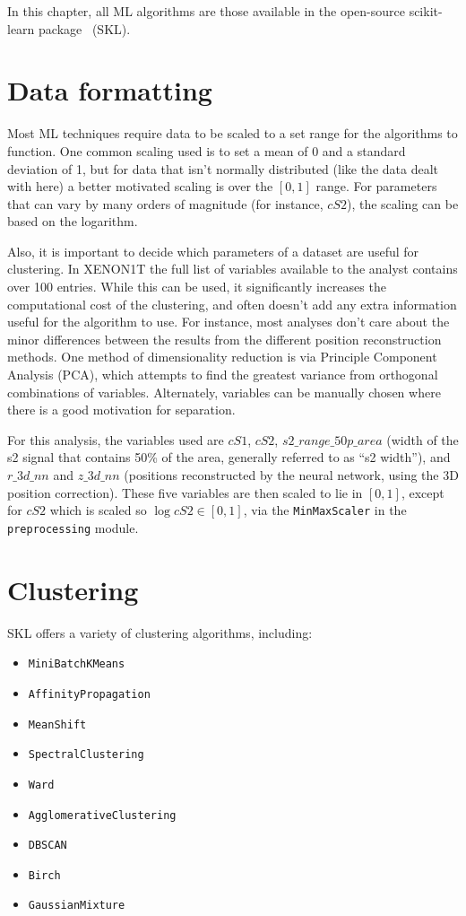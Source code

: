 In this chapter, all ML algorithms are those available in the open-source scikit-learn package~\cite{skl} (SKL).

\section{Data formatting}

Most ML techniques require data to be scaled to a set range for the algorithms to function. One common scaling used is to set a mean of 0 and a standard deviation of 1, but for data that isn't normally distributed (like the data dealt with here) a better motivated scaling is over the $[0,1]$ range. For parameters that can vary by many orders of magnitude (for instance, $cS2$), the scaling can be based on the logarithm.

Also, it is important to decide which parameters of a dataset are useful for clustering. In XENON1T the full list of variables available to the analyst contains over 100 entries. While this can be used, it significantly increases the computational cost of the clustering, and often doesn't add any extra information useful for the algorithm to use. For instance, most analyses don't care about the minor differences between the results from the different position reconstruction methods. One method of dimensionality reduction is via Principle Component Analysis (PCA), which attempts to find the greatest variance from orthogonal combinations of variables. Alternately, variables can be manually chosen where there is a good motivation for separation.

For this analysis, the variables used are $cS1$, $cS2$, $s2\_range\_50p\_area$ (width of the s2 signal that contains 50\% of the area, generally referred to as ``s2 width''), and $r\_3d\_nn$ and $z\_3d\_nn$ (positions reconstructed by the neural network, using the 3D position correction). These five variables are then scaled to lie in $[0,1]$, except for $cS2$ which is scaled so $\log cS2 \in [0,1]$, via the \texttt{MinMaxScaler} in the \texttt{preprocessing} module.

\section{Clustering}

SKL offers a variety of clustering algorithms, including:
\begin{itemize}
    \item \texttt{MiniBatchKMeans}
    \item \texttt{AffinityPropagation}
    \item \texttt{MeanShift}
    \item \texttt{SpectralClustering}
    \item \texttt{Ward}
    \item \texttt{AgglomerativeClustering}
    \item \texttt{DBSCAN}
    \item \texttt{Birch}
    \item \texttt{GaussianMixture}
\end{itemize}


